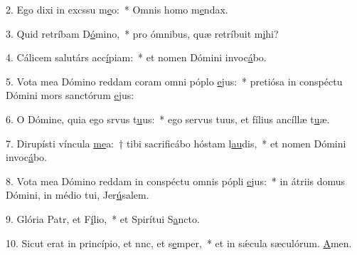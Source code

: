 2. Ego dixi in excssu m\uline{e}o:~* Omnis homo m\uline{e}ndax.\par 
3. Quid retríbam D\uline{ó}mino,~* pro ómnibus, quæ retríbuit m\uline{i}hi?\par 
4. Cálicem salutárs acc\uline{í}piam:~* et nomen Dómini invoc\uline{á}bo.\par 
5. Vota mea Dómino reddam coram omni póplo \uline{e}jus:~* pretiósa in conspéctu Dómini mors sanctórum \uline{e}jus:\par 
6. O Dómine, quia ego srvus t\uline{u}us:~* ego servus tuus, et fílius ancíllæ t\uline{u}æ.\par 
7. Dirupísti víncula \uline{me}a:~† tibi sacrificábo hóstam l\uline{au}dis,~* et nomen Dómini invoc\uline{á}bo.\par 
8. Vota mea Dómino reddam in conspéctu omnis pópli \uline{e}jus:~* in átriis domus Dómini, in médio tui, Jer\uline{ú}salem.\par 
9. Glória Patr, et F\uline{í}lio,~* et Spirítui S\uline{a}ncto.\par 
10. Sicut erat in princípio, et nnc, et s\uline{e}mper,~* et in sǽcula sæculórum. \uline{A}men.\par 
